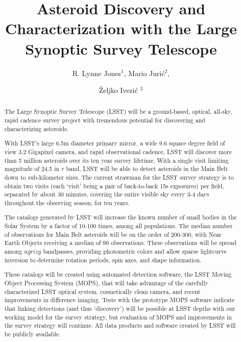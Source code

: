 \documentclass{iau}
\title[Asteroids in LSST] %
{Asteroid Discovery and Characterization with the Large Synoptic Survey Telescope}
\author[R. L.  Jones, M. Juri\'{c}, \v{Z}. Ivezi\'{c}]   %
{R. Lynne Jones$^1$, Mario Juri\'{c}$^2$, 
 \and \v{Z}eljko Ivezi\'{c} $^3$}
\affiliation{$^1$University of Washington, email: {\tt ljones@astro.washington.edu} \\
$^2$University of Washington, email: {\tt mjuric@astro.astro.washington.edu} \\
$^3$University of Washington, email: {\tt ivezic@astro.astro.washington.edu}}
\begin{document}
\maketitle

\begin{abstract}
The Large Synoptic Survey Telescope (LSST) will be a ground-based,
optical, all-sky, rapid cadence survey project with tremendous
potential for discovering and characterizing asteroids.

With LSST's large 6.5m diameter primary mirror, a wide 9.6 square
degree field of view 3.2 Gigapixel camera, and rapid observational
cadence, LSST will discover more than 5 million asteroids over its ten
year survey lifetime. With a single visit limiting magnitude of 24.5
in $r$ band, LSST will be able to detect asteroids in the Main Belt
down to sub-kilometer sizes.  The current strawman for the LSST survey
strategy is to obtain two visits (each `visit' being a pair of
back-to-back 15s exposures) per field, separated by about 30 minutes,
covering the entire visible sky every 3-4 days throughout the
observing season, for ten years.

The catalogs generated by LSST will increase the known number of small
bodies in the Solar System by a factor of 10-100 times, among all
populations. The median number of observations for Main Belt asteroids
will be on the order of 200-300, with Near Earth Objects receiving a
median of 90 observations. These observations will be spread among
$ugrizy$ bandpasses, providing photometric colors and allow
sparse lightcurve inversion to determine rotation periods, spin axes, and shape information.

These catalogs will be created using automated detection software, the
LSST Moving Object Processing System (MOPS), that will take advantage
of the carefully characterized LSST optical system, cosmetically
clean camera, and recent improvements in difference imaging. Tests
with the prototype MOPS software indicate that linking detections (and thus
`discovery') will be possible at LSST depths with our working
model for the survey strategy, but evaluation of MOPS and improvements
in the survey strategy will continue. All data products and software created by
LSST will be publicly available.
\end{abstract}

\firstsection %
\end{document}
